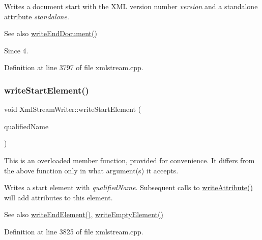 Writes a document start with the X\+ML version number {\itshape version} and a standalone attribute {\itshape standalone}.

\begin{DoxySeeAlso}{See also}
\hyperlink{class_xml_stream_writer_a4fa078ed52892cec544e890efb1c3b50}{write\+End\+Document()} 
\end{DoxySeeAlso}
\begin{DoxySince}{Since}
4. 
\end{DoxySince}


Definition at line 3797 of file xmlstream.\+cpp.

\mbox{\label{class_xml_stream_writer_aa001c660c1df012b4e37773aa219c379}} 
\subsubsection{\texorpdfstring{write\+Start\+Element()}{writeStartElement()}\hspace{0.1cm}{\footnotesize\ttfamily [1/2]}}
{\footnotesize\ttfamily void Xml\+Stream\+Writer\+::write\+Start\+Element (\begin{DoxyParamCaption}\item[{const Q\+String \&}]{qualified\+Name }\end{DoxyParamCaption})}

This is an overloaded member function, provided for convenience. It differs from the above function only in what argument(s) it accepts.

Writes a start element with {\itshape qualified\+Name}. Subsequent calls to \hyperlink{class_xml_stream_writer_a685d12dc71870e20e835085b6326787b}{write\+Attribute()} will add attributes to this element.

\begin{DoxySeeAlso}{See also}
\hyperlink{class_xml_stream_writer_add89e8f61a141e2b320cf2b567e7edfb}{write\+End\+Element()}, \hyperlink{class_xml_stream_writer_a07e058f896327e9236e7c19132842cf2}{write\+Empty\+Element()} 
\end{DoxySeeAlso}


Definition at line 3825 of file xmlstream.\+cpp.

\mbox{\label{class_xml_stream_writer_ab8d06c59d1684e88d2bd820c72baf7bc}} 
